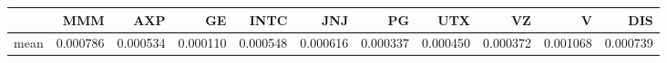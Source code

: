 \begin{tabular}{lrrrrrrrrrr}
\toprule
{} & MMM &  AXP & GE & INTC & JNJ & PG & UTX & VZ & V & DIS \\
\midrule
mean & 0.000786 & 0.000534  & 0.000110  & 0.000548  & 0.000616  & 0.000337  & 0.000450 & 0.000372 & 0.001068 & 0.000739 \\
\bottomrule
\end{tabular}
